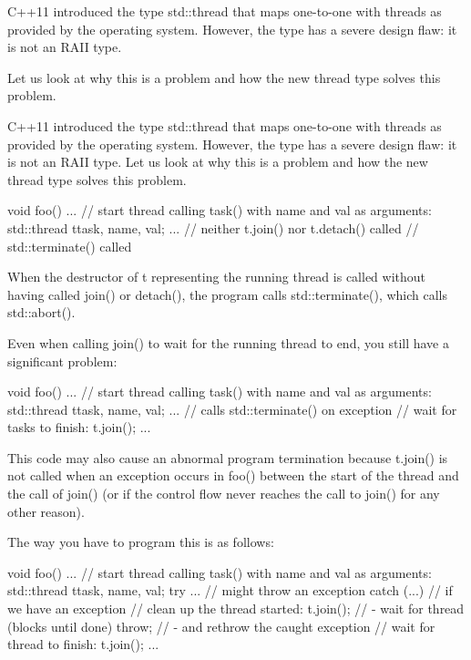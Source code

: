 
C++11 introduced the type std::thread that maps one-to-one with threads as provided by the operating system. However, the type has a severe design flaw: it is not an RAII type.

Let us look at why this is a problem and how the new thread type solves this problem.


C++11 introduced the type std::thread that maps one-to-one with threads as provided by the operating system. However, the type has a severe design flaw: it is not an RAII type. Let us look at why this is a problem and how the new thread type solves this problem.

\begin{cpp}
void foo()
{
	...
	// start thread calling task() with name and val as arguments:
	std::thread t{task, name, val};
	... // neither t.join() nor t.detach() called
} // std::terminate() called
\end{cpp}

When the destructor of t representing the running thread is called without having called join() or detach(), the program calls std::terminate(), which calls std::abort().

Even when calling join() to wait for the running thread to end, you still have a significant problem:

\begin{cpp}
void foo()
{
	...
	// start thread calling task() with name and val as arguments:
	std::thread t{task, name, val};
	... // calls std::terminate() on exception
	// wait for tasks to finish:
	t.join();
	...
}
\end{cpp}

This code may also cause an abnormal program termination because t.join() is not called when an exception occurs in foo() between the start of the thread and the call of join() (or if the control flow never reaches the call to join() for any other reason).

The way you have to program this is as follows:

\begin{cpp}
void foo()
{
	...
	// start thread calling task() with name and val as arguments:
	std::thread t{task, name, val};
	try {
		... // might throw an exception
	}
	catch (...) { // if we have an exception
		// clean up the thread started:
		t.join(); // - wait for thread (blocks until done)
		throw; // - and rethrow the caught exception
	}
	// wait for thread to finish:
	t.join();
	...
}
\end{cpp}


